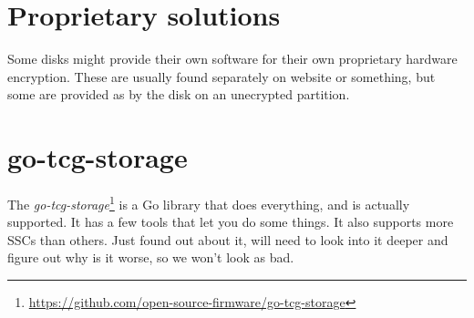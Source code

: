 
\section{Proprietary solutions}

Some disks might provide their own software for their own proprietary hardware encryption. These are usually found separately on website or something, but some are provided as by the disk on an unecrypted partition.


\section{go-tcg-storage}

The \emph{go-tcg-storage}\footnote{\url{https://github.com/open-source-firmware/go-tcg-storage}} is a Go library that does everything, and is actually supported. It has a few tools that let you do some things. It also supports more SSCs than others. Just found out about it, will need to look into it deeper and figure out why is it worse, so we won't look as bad.

